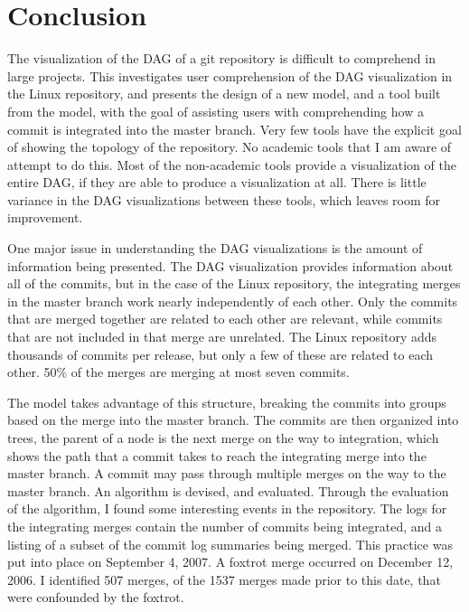 \chapter{Conclusion}\label{chap:conclusion}

The visualization of the DAG of a git repository is difficult to
comprehend in large projects.
This \paper{} investigates user comprehension of the DAG
visualization in the Linux repository, and presents the design of a new
model, and a tool built from the model, with the goal of assisting users
with comprehending how a commit is integrated into the master branch.
Very few tools have the explicit goal of showing the topology of the
repository. No academic tools that I am aware of attempt to do this.
Most of the non-academic tools provide a visualization of the entire
DAG, if they are able to produce a visualization at all. There is little
variance in the DAG visualizations between these tools, which leaves
room for improvement.

One major issue in understanding the DAG visualizations is the amount of
information being presented. The DAG visualization provides information
about all of the commits, but in the case of the Linux repository, the
integrating merges in the master branch work nearly independently of
each other. Only the commits that are merged together are related to
each other are relevant, while commits that are not included in that
merge are unrelated. The Linux repository adds thousands of commits per
release, but only a few of these are related to each other. 50\% of the
merges are merging at most seven commits.

The \mt{} model takes advantage of this structure, breaking the commits
into groups based on the merge into the master branch. The commits are
then organized into trees, the parent of a node is the next merge on the
way to integration, which shows the path that a commit takes to reach
the integrating merge into the master branch.  A commit may pass through
multiple merges on the way to the master branch. An algorithm is
devised, and evaluated. Through the evaluation of the algorithm, I found
some interesting events in the repository. The logs for the integrating
merges contain the number of commits being integrated, and a listing of
a subset of the commit log summaries being merged. This practice was put
into place on September 4, 2007. A foxtrot merge occurred on December
12, 2006. I identified 507 merges, of the 1537 merges made prior to this
date, that were confounded by the foxtrot.


